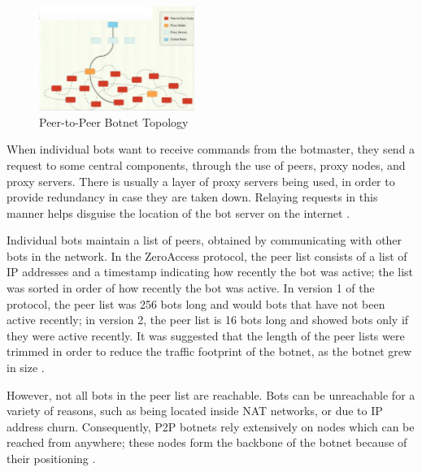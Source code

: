 \documentclass{acm_proc_article-sp}
\begin{document}
\begin{figure}[h]\centering
\includegraphics[width=0.45\textwidth,natwidth=801,natheight=538]{p2p-architecture.png}
\caption{Peer-to-Peer Botnet Topology}
\label{fig:p2p-architecture}
\end{figure}


When individual bots want to receive commands from the botmaster, they send a request to some central components, through the use of peers, proxy nodes, and proxy servers. There is usually a layer of proxy servers being used, in order to provide redundancy in case they are taken down. Relaying requests in this manner helps disguise the location of the bot server on the internet \cite{defcon:prowling}.

Individual bots maintain a list of peers, obtained by communicating with other bots in the network.  In the ZeroAccess protocol, the peer list consists of a list of IP addresses and a timestamp indicating how recently the bot was active; the list was sorted in order of how recently the bot was active. In version 1 of the protocol, the peer list was 256 bots long and would bots that have not been active recently; in version 2, the peer list is 16 bots long and showed bots only if they were active recently.  It was suggested that the length of the peer lists were trimmed in order to reduce the traffic footprint of the botnet, as the botnet grew in size  \cite{defcon:prowling}.  

However, not all bots in the peer list are reachable.  Bots can be unreachable for a variety of reasons, such as being located inside NAT networks, or due to IP address churn.   Consequently, P2P botnets rely extensively on nodes which can be reached from anywhere; these nodes form the backbone of the botnet because of their positioning \cite{defcon:prowling}.
\end{document}

